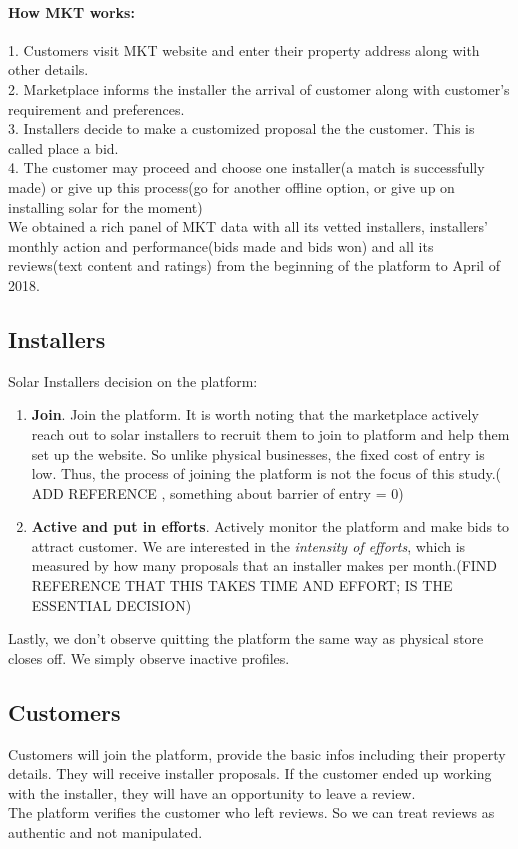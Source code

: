 \documentclass[mnsc,blindrev]{informs3} %
\begin{document}
\paragraph{How MKT works:}
1. Customers visit MKT website and enter their property address along with other details.  \\
2. Marketplace informs the installer the arrival of customer along with customer's requirement and preferences. \\
3. Installers decide to make a customized proposal the the customer. This is called place a bid. \\
4. The customer may proceed and choose one installer(a match is successfully made) or give up this process(go for another offline option, or give up on installing solar for the moment) \\ 
We obtained a rich panel of MKT data with all its vetted installers, installers' monthly action and performance(bids made and bids won) and all its reviews(text content and ratings) from the beginning of the platform to April of 2018. 

\subsection{Installers}
Solar Installers decision on the platform: 

\begin{enumerate}
\item  \textbf{Join}. Join the platform. It is worth noting that the marketplace actively reach out to solar installers to recruit them to join to platform and help them set up the website. So unlike physical businesses, the fixed cost of entry is low. Thus, the process of joining the platform is not the focus of this study.( ADD REFERENCE , something about barrier of entry = 0)  \\
\item  \textbf{Active and put in efforts}. Actively monitor the platform and make bids to attract customer. We are interested in the\textit{ intensity of efforts}, which is measured by how many proposals that an installer makes per month.(FIND REFERENCE THAT THIS TAKES TIME AND EFFORT; IS THE ESSENTIAL DECISION)\\
\end{enumerate}

Lastly, we don't observe quitting the platform the same way as physical store closes off. We simply observe inactive profiles. 


\subsection{Customers}
Customers will join the platform, provide the basic infos including their property details. They will receive installer proposals. If the customer ended up working with the installer, they will have an opportunity to leave a review. \\
The platform verifies the customer who left reviews. So we can treat reviews as authentic and not manipulated. 
\end{document}
